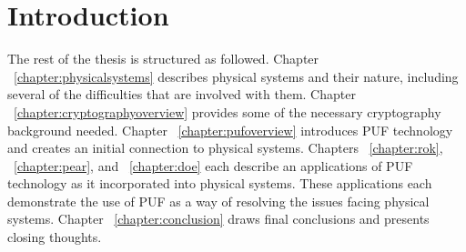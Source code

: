 %
%
%

\chapter{Introduction}
\label{chapter:intro}

The rest of the thesis is structured as followed. 
Chapter ~\ref{chapter:physicalsystems} describes physical systems and their nature, including several of the difficulties that are involved with them. 
Chapter ~\ref{chapter:cryptographyoverview} provides some of the necessary cryptography background needed. 
Chapter ~\ref{chapter:pufoverview} introduces PUF technology and creates an initial connection to physical systems. 
Chapters ~\ref{chapter:rok},  ~\ref{chapter:pear}, and ~\ref{chapter:doe} each describe an applications of PUF technology as it incorporated into physical systems. These applications each demonstrate the use of PUF as a way of resolving the issues facing physical systems. 
Chapter ~\ref{chapter:conclusion} draws final conclusions and presents
closing thoughts.
